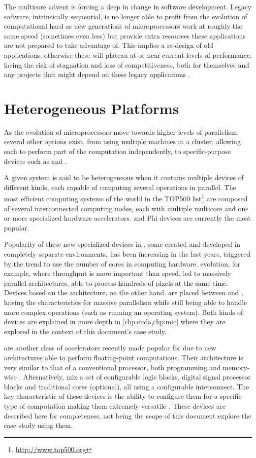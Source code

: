 \documentclass[../thesis]{subfiles}
\begin{document}
		The multicore advent is forcing a deep in change in software development. Legacy software, intrinsically sequential, is no longer able to profit from the evolution of computational hard as new generations of microprocessors work at roughly the same speed (sometimes even less) but provide extra resources these applications are not prepared to take advantage of. This implies a re-design of old applications, otherwise these will plateau at or near current levels of performance, facing the risk of stagnation and loss of competitiveness, both for themselves and any projects that might depend on these legacy applications \cite{Farber:2011:RedefiningWhatIsPossible}.

		\section{Heterogeneous Platforms}
		As the evolution of microprocessors move towards higher levels of parallelism, several other options exist, from using multiple machines in a cluster, allowing each to perform part of the computation independently, to specific-purpose devices such as \dsps and \gpus.

		A given system is said to be heterogeneous when it contains multiple devices of different kinds, each capable of computing several operations in parallel. The most efficient computing systems of the world in the TOP500 list\footnote{\url{http://www.top500.org}} are composed of several interconnected computing nodes, each with multiple multicore \cpus and one or more specialized hardware accelerators. \gpus and \intel\xeon Phi devices are currently the most popular.

		Popularity of these new specialized devices in \hpc, some created and developed in completely separate environments, has been increasing in the last years, triggered by the trend to use the number of cores in computing hardware. \gpus evolution, for example, where throughput is more important than speed, led to massively parallel architectures, able to process hundreds of pixels at the same time. Devices based on the \intel\mic architecture, on the other hand, are placed between \gpus and \cpus, having the characteristics for massive parallelism while still being able to handle more complex operations (such as running an operating system). Both kinds of devices are explained in more depth in \cref{chp:cuda,chp:mic} where they are explored in the context of this document's case study.

		\dsps are another class of accelerators recently made popular for \hpc due to new architectures able to perform floating-point computations. Their architecture is very similar to that of a conventional processor, both programming and memory-wise \cite{FLAWN61}. Alternatively, \fpgas mix a set of configurable logic blocks, digital signal processor blocks and traditional \cpu cores (optional), all using a configurable interconnect. The key characteristic of these devices is the ability to configure them for a specific type of computation making them extremely versatile \cite{Brodtkorb:2010}. These devices are described here for completeness, not being the scope of this document explore the case study using them.
\end{document}
